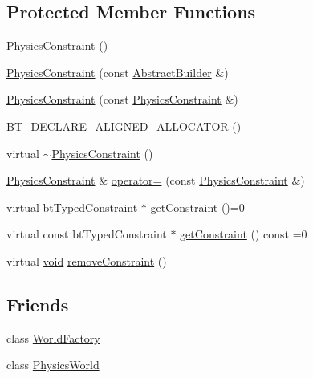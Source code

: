 \subsection*{Protected Member Functions}
\begin{DoxyCompactItemize}
\item 
\mbox{\hyperlink{classnjli_1_1_physics_constraint_a7b3e8cf84cbb22fc6a9e238c56404a03}{Physics\+Constraint}} ()
\item 
\mbox{\hyperlink{classnjli_1_1_physics_constraint_a7b711432de531a357b0b49e446d224bf}{Physics\+Constraint}} (const \mbox{\hyperlink{classnjli_1_1_abstract_builder}{Abstract\+Builder}} \&)
\item 
\mbox{\hyperlink{classnjli_1_1_physics_constraint_ae70f2363020b35433e46fa34fba42752}{Physics\+Constraint}} (const \mbox{\hyperlink{classnjli_1_1_physics_constraint}{Physics\+Constraint}} \&)
\item 
\mbox{\hyperlink{classnjli_1_1_physics_constraint_acea9f53b2ec41266be66764bf000e603}{B\+T\+\_\+\+D\+E\+C\+L\+A\+R\+E\+\_\+\+A\+L\+I\+G\+N\+E\+D\+\_\+\+A\+L\+L\+O\+C\+A\+T\+OR}} ()
\item 
virtual \mbox{\hyperlink{classnjli_1_1_physics_constraint_a7532a67911e2d8aba738f08638c2efb5}{$\sim$\+Physics\+Constraint}} ()
\item 
\mbox{\hyperlink{classnjli_1_1_physics_constraint}{Physics\+Constraint}} \& \mbox{\hyperlink{classnjli_1_1_physics_constraint_a354f06ed616836ba1a5b21387ed5b83b}{operator=}} (const \mbox{\hyperlink{classnjli_1_1_physics_constraint}{Physics\+Constraint}} \&)
\item 
virtual bt\+Typed\+Constraint $\ast$ \mbox{\hyperlink{classnjli_1_1_physics_constraint_a0a22d54c2c896af49fa57db9be76a5da}{get\+Constraint}} ()=0
\item 
virtual const bt\+Typed\+Constraint $\ast$ \mbox{\hyperlink{classnjli_1_1_physics_constraint_af4cb8c0158a044f75fe61f89cc278338}{get\+Constraint}} () const =0
\item 
virtual \mbox{\hyperlink{_thread_8h_af1e856da2e658414cb2456cb6f7ebc66}{void}} \mbox{\hyperlink{classnjli_1_1_physics_constraint_ae3dc487da3069d859bb4ddb05aa2e779}{remove\+Constraint}} ()
\end{DoxyCompactItemize}
\subsection*{Friends}
\begin{DoxyCompactItemize}
\item 
class \mbox{\hyperlink{classnjli_1_1_physics_constraint_acb96ebb09abe8f2a37a915a842babfac}{World\+Factory}}
\item 
class \mbox{\hyperlink{classnjli_1_1_physics_constraint_abd7959b8cbcd7c25bc6c0c8b1ea26ce6}{Physics\+World}}
\end{DoxyCompactItemize}


